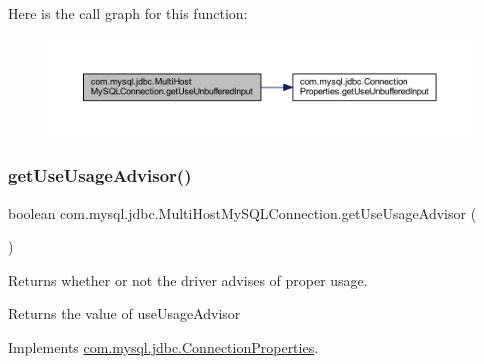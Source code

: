 Here is the call graph for this function\+:
\nopagebreak
\begin{figure}[H]
\begin{center}
\leavevmode
\includegraphics[width=350pt]{classcom_1_1mysql_1_1jdbc_1_1_multi_host_my_s_q_l_connection_a4d1dd6152a4a012bf93be333f0e98aba_cgraph}
\end{center}
\end{figure}
\mbox{\label{classcom_1_1mysql_1_1jdbc_1_1_multi_host_my_s_q_l_connection_a713344936008f7ef2eefecaec2aa5754}} 
\subsubsection{\texorpdfstring{get\+Use\+Usage\+Advisor()}{getUseUsageAdvisor()}}
{\footnotesize\ttfamily boolean com.\+mysql.\+jdbc.\+Multi\+Host\+My\+S\+Q\+L\+Connection.\+get\+Use\+Usage\+Advisor (\begin{DoxyParamCaption}{ }\end{DoxyParamCaption})}

Returns whether or not the driver advises of proper usage.

\begin{DoxyReturn}{Returns}
the value of use\+Usage\+Advisor 
\end{DoxyReturn}


Implements \mbox{\hyperlink{interfacecom_1_1mysql_1_1jdbc_1_1_connection_properties_ac3d940436d5babe33067c3f75817e9a9}{com.\+mysql.\+jdbc.\+Connection\+Properties}}.

